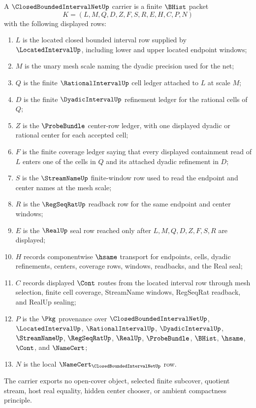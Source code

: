 \begin{definition}
\label{def:closed-bounded-interval-net-carrier}
A $\ClosedBoundedIntervalNetUp$ carrier is a finite $\BHist$ packet
$$
K=(L,M,Q,D,Z,F,S,R,E,H,C,P,N)
$$
with the following displayed rows:
\begin{enumerate}
\item $L$ is the located closed bounded interval row supplied by $\LocatedIntervalUp$, including lower and upper located endpoint windows;
\item $M$ is the unary mesh scale naming the dyadic precision used for the net;
\item $Q$ is the finite $\RationalIntervalUp$ cell ledger attached to $L$ at scale $M$;
\item $D$ is the finite $\DyadicIntervalUp$ refinement ledger for the rational cells of $Q$;
\item $Z$ is the $\ProbeBundle$ center-row ledger, with one displayed dyadic or rational center for each accepted cell;
\item $F$ is the finite coverage ledger saying that every displayed containment read of $L$ enters one of the cells in $Q$ and its attached dyadic refinement in $D$;
\item $S$ is the $\StreamNameUp$ finite-window row used to read the endpoint and center names at the mesh scale;
\item $R$ is the $\RegSeqRatUp$ readback row for the same endpoint and center windows;
\item $E$ is the $\RealUp$ seal row reached only after $L,M,Q,D,Z,F,S,R$ are displayed;
\item $H$ records componentwise $\hsame$ transport for endpoints, cells, dyadic refinements, centers, coverage rows, windows, readbacks, and the Real seal;
\item $C$ records displayed $\Cont$ routes from the located interval row through mesh selection, finite cell coverage, StreamName windows, RegSeqRat readback, and RealUp sealing;
\item $P$ is the $\Pkg$ provenance over $\ClosedBoundedIntervalNetUp$, $\LocatedIntervalUp$, $\RationalIntervalUp$, $\DyadicIntervalUp$, $\StreamNameUp$, $\RegSeqRatUp$, $\RealUp$, $\ProbeBundle$, $\BHist$, $\hsame$, $\Cont$, and $\NameCert$;
\item $N$ is the local $\NameCert_{\ClosedBoundedIntervalNetUp}$ row.
\end{enumerate}
The carrier exports no open-cover object, selected finite subcover, quotient stream, host real equality, hidden center chooser, or ambient compactness principle.
\end{definition}

